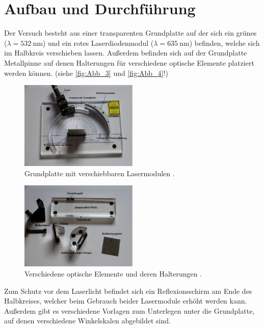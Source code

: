 \section{Aufbau und Durchführung}
\label{sec:Durchführung}

Der Versuch besteht aus einer transparenten Grundplatte auf der sich ein grünes ($\lambda=\qty{532}{\nano\meter}$) und ein rotes Laserdiodenmodul ($\lambda=\qty{635}{\nano\meter}$)  befinden, welche sich im Halbkreis
verschieben lassen. Außerdem befinden sich auf der Grundplatte Metallpinne auf denen Halterungen für verschiedene optische Elemente 
platziert werden können. (siehe \autoref{fig:Abb_3} und \autoref{fig:Abb_4}!)
\begin{figure}[H]
    \centering
    \includegraphics[width=0.5\textwidth]{build/Abb_3.pdf}
    \caption {Grundplatte mit verschiebbaren Lasermodulen \cite[1]{V400}.}
    \label{fig:Abb_3}
\end{figure}

\begin{figure}[H]
    \centering
    \includegraphics[width=0.5\textwidth]{build/Abb_4.pdf}
    \caption {Verschiedene optische Elemente und deren Halterungen \cite[1]{V400}.}
    \label{fig:Abb_4}
\end{figure}

Zum Schutz vor dem Laserlicht befindet sich ein Reflexionsschirm am Ende des Halbkreises, welcher beim Gebrauch beider Lasermodule
erhöht werden kann.
Außerdem gibt es verschiedene Vorlagen zum Unterlegen unter die Grundplatte, auf denen verschiedene Winkelskalen abgebildet sind.


